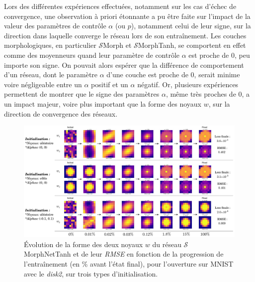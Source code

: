 Lors des différentes expériences effectuées, notamment sur les cas d'échec de convergence, une observation à priori étonnante a pu être faite sur l'impact de la valeur des paramètres de contrôle $\alpha$ (ou $p$), notamment celui de leur signe, sur la direction dans laquelle converge le réseau lors de son entraînement. Les couches morphologiques, en particulier $\mathcal{S}$Morph et $\mathcal{S}$MorphTanh, se comportent en effet comme des moyenneurs quand leur paramètre de contrôle $\alpha$ est proche de 0, peu importe son signe. On pouvait alors espérer que la différence de comportement d'un réseau, dont le paramètre $\alpha$ d'une couche est proche de 0, serait minime voire négligeable entre un $\alpha$ positif et un $\alpha$ négatif. Or, plusieurs expériences permettent de montrer que le signe des paramètres $\alpha$, même très proches de 0, a un impact majeur, voire plus important que la forme des noyaux $w$, sur la direction de convergence des réseaux. \\

\vspace{-0.6mm}
\begin{figure}[htp]
  \begin{center}
    \includegraphics[width=1.00\linewidth]{parts/4-analyse_des_reseaux/others/figures/zzzzz.pdf}
    \vspace{-4.0mm}
    \caption{ \centering Évolution de la forme des deux noyaux $w$ du réseau $\mathcal{S}$MorphNetTanh et de leur \textit{RMSE} en fonction de la progression de l'entraînement (en \% avant l'état final), pour l'ouverture sur MNIST avec le \textit{disk2}, sur trois types d'initialisation.}
    \label{fig:zzzzz}
  \end{center}
\end{figure}


